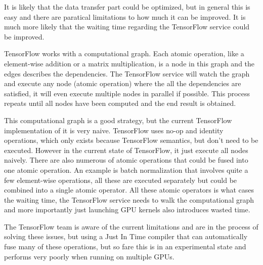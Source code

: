 It is likely that the data transfer part could be optimized, but in general this is easy and there are paratical limitations to how much it can be improved. It is much more likely that the waiting time regarding the TensorFlow service could be improved.

TensorFlow works with a computational graph. Each atomic operation, like a element-wise addition or a matrix multiplication, is a node in this graph and the edges describes the dependencies. The TensorFlow service will watch the graph and execute any node (atomic operation) where the all the dependencies are satisfied, it will even execute multiple nodes in parallel if possible. This process repeats until all nodes have been computed and the end result is obtained.

This computational graph is a good strategy, but the current TensorFlow implementation of it is very naive. TensorFlow uses no-op and identity operations, which only exists because TensorFlow semantics, but don't need to be executed. However in the current state of TensorFlow, it just execute all nodes naively. There are also numerous of atomic operations that could be fused into one atomic operation. An example is batch normalization that involves quite a few element-wise operations, all these are executed separately but could be combined into a single atomic operator. All these atomic operators is what cases the waiting time, the TensorFlow service needs to walk the computational graph and more importantly just launching GPU kernels also introduces wasted time.

The TensorFlow team is aware of the current limitations and are in the process of solving these issues, but using a Just In Time compiler that can automatically fuse many of these operations, but so fare this is in an experimental state and performs very poorly when running on multiple GPUs.
